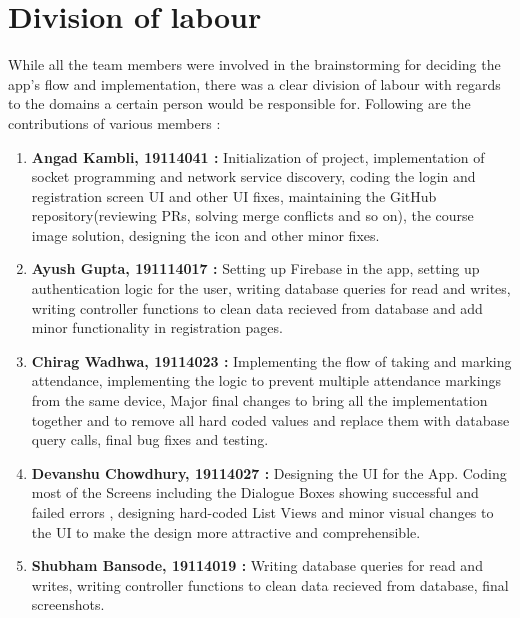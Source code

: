\documentclass{article}
\begin{document}
\section{Division of labour}
While all the team members were involved in the brainstorming for deciding the app's flow and implementation, there was a clear division of labour with regards to the domains a certain person would be responsible for. Following are the contributions of various members :
\begin{enumerate}
    \item \textbf{Angad Kambli, 19114041 :} Initialization of project, implementation of socket programming and network service discovery, coding the login and registration screen UI and other UI fixes, maintaining the GitHub repository(reviewing PRs, solving merge conflicts and so on), the course image solution, designing the icon and other minor fixes.
    \item \textbf{Ayush Gupta, 191114017 : } Setting up Firebase in the app, setting up authentication logic for the user, writing database queries for read and writes, writing controller functions to clean data recieved from database and add minor functionality in registration pages.
    \item \textbf{Chirag Wadhwa, 19114023 : } Implementing the flow of taking and marking attendance, implementing the logic to prevent multiple attendance markings from the same device, Major final changes to bring all the implementation together and to remove all hard coded values and replace them with database query calls, final bug fixes and testing.
    \item \textbf{Devanshu Chowdhury, 19114027 : } Designing the UI for the App. Coding most of the Screens including the Dialogue Boxes showing successful and failed errors , designing hard-coded List Views and minor visual changes to the UI to make the design more attractive and comprehensible.
    \item \textbf{Shubham Bansode, 19114019 : }  Writing database queries for read and writes, writing controller functions to clean data recieved from database, final screenshots.
\end{enumerate}
\end{document}
